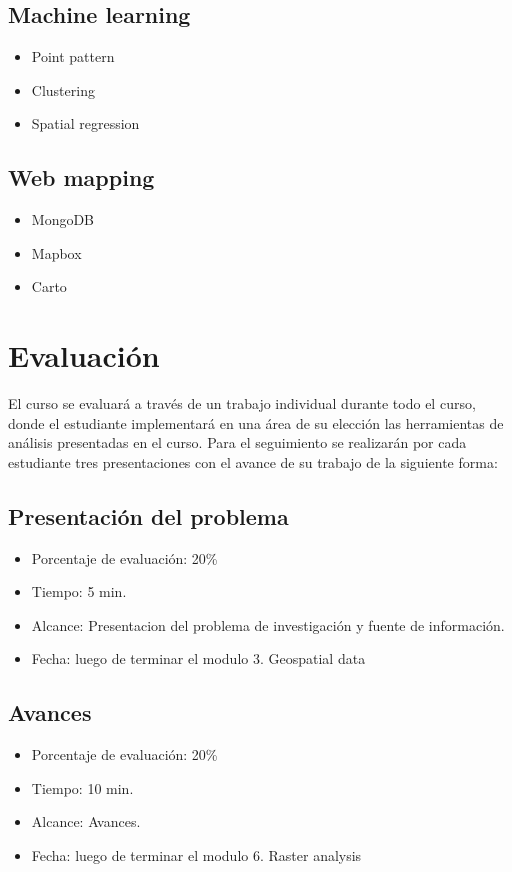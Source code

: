 \documentclass[a4paper,twoside,11pt,]{article}
\begin{document}
\subsection{Machine learning}
\begin{itemize}
    \item Point pattern
    \item Clustering
    \item Spatial regression
\end{itemize}

\subsection{Web mapping}
\begin{itemize}
    \item MongoDB
    \item Mapbox
    \item Carto
\end{itemize}

\section{Evaluación}
El curso se evaluará a través de un trabajo individual durante todo el curso, donde el estudiante implementará en una área de 
su elección las herramientas de análisis presentadas en el curso. Para el seguimiento se realizarán por cada estudiante tres 
presentaciones con el avance de su trabajo de la siguiente forma:

\subsection{Presentación del problema}
\begin{itemize}
    \item Porcentaje de evaluación: 20\%
    \item Tiempo: 5 min.
    \item Alcance: Presentacion del problema de investigación y fuente de información.
    \item Fecha: luego de terminar el modulo 3. Geospatial data
\end{itemize}

\subsection{Avances}
\begin{itemize}
    \item Porcentaje de evaluación: 20\%
    \item Tiempo: 10 min.
    \item Alcance: Avances.
    \item Fecha: luego de terminar el modulo 6. Raster analysis
\end{itemize}
\end{document}
